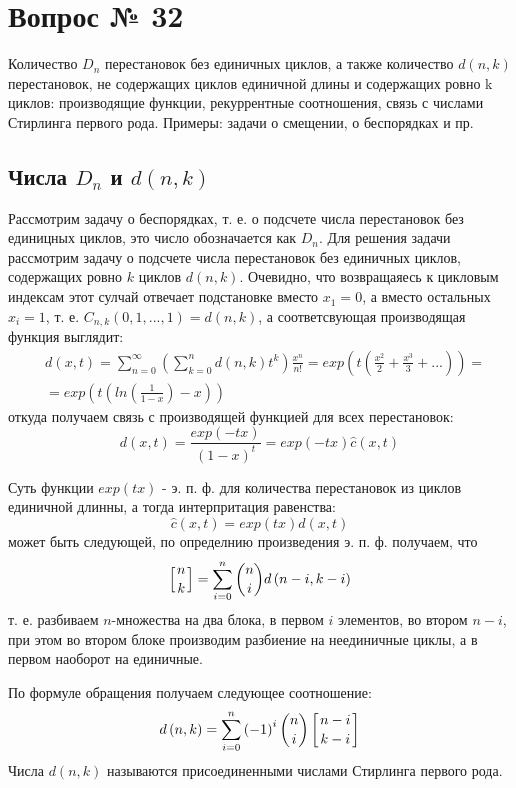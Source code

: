 \chapter{Вопрос № 32}

Количество $D_n$ перестановок без единичных циклов, а также количество $d(n, k)$ перестановок, не содержащих циклов единичной длины и содержащих ровно k циклов: производящие функции, рекуррентные соотношения, связь с числами Стирлинга первого рода. Примеры: задачи о смещении, о беспорядках и пр.

\section{Числа $D_n$ и $d\left(n,k\right)$}

Рассмотрим задачу о беспорядках, т. е. о подсчете числа перестановок без единицных циклов, это число обозначается как $D_n$. Для решения задачи рассмотрим задачу о подсчете числа перестановок без единичных циклов, содержащих ровно $k$ циклов $d\left(n,k\right)$. Очевидно, что возвращаяесь к цикловым индексам этот сулчай отвечает подстановке вместо $x_1 = 0$, а вместо остальных $x_i = 1$, т. е. $C_{n,k}\left(0,1,...,1\right) = d\left(n,k\right)$, а соответсвующая производящая функция выглядит:
\[
	\begin{split}
		&d\left(x,t\right) = \sum_{n=0}^{\infty}\left(\sum_{k=0}^n d\left(n,k\right)t^k\right)\frac{x^n}{n!} = exp\left(t\left(\frac{x^2}{2} + \frac{x^3}{3} + ...\right)\right) = \\
		& = exp\left(t\left(ln\left(\frac{1}{1-x}\right) - x\right)\right)
	\end{split}
\]
откуда получаем связь с производящей функцией для всех перестановок:
\[
	d\left(x,t\right) = \frac{exp\left(-tx\right)}{\left(1-x\right)^t} = exp\left(-tx\right)\hat c\left(x,t\right)
\]

Суть функции $exp\left(tx\right)$ - э. п. ф. для количества перестановок из циклов единичной длинны, а тогда интерпритация равенства:
\[
	\hat c\left(x,t\right) = exp\left(tx\right)d\left(x,t\right)
\]
может быть следующей, по определнию произведения э. п. ф. получаем, что
\[
	\left[{{n} \atop {k}}\right] = \sum_{i = 0}^n \binom{n}{i} d\left(n-i,k-i\right)
\]
т. е. разбиваем $n$-множества на два блока, в первом $i$ элементов, во втором $n-i$, при этом во втором блоке производим разбиение на неединичные циклы, а в первом наоборот на единичные.

По формуле обращения получаем следующее соотношение:
\[
	d\left(n,k\right) = \sum_{i=0}^n \left(-1\right)^i \binom{n}{i} \left[{{n-i}\atop{k-i}}\right]
\]
Числа $d\left(n,k\right)$ называются присоединенными числами Стирлинга первого рода.

